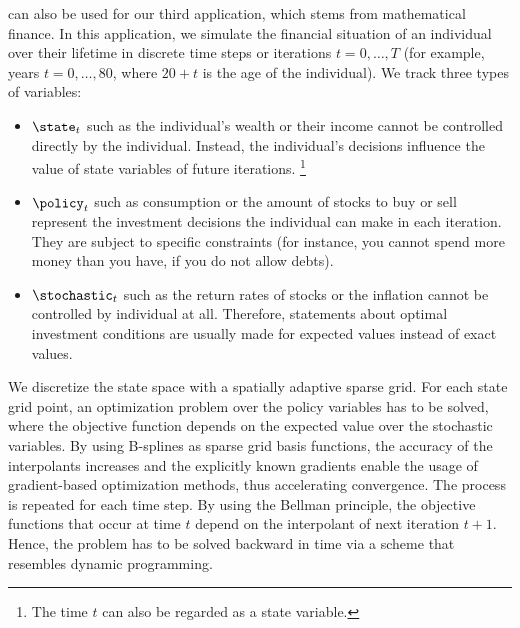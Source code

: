 
\label{chap:80finance}

can also be used for our third application,
which stems from mathematical finance.
In this application, we simulate the financial situation of an individual
over their lifetime in discrete time steps or iterations $t = 0, \dotsc, T$
(for example, years $t = 0, \dotsc, 80$, where $20+t$ is the age
of the individual).
We track three types of variables:

\begin{itemize}
  \item
   $\state_t$
  such as the individual's wealth or their income
  cannot be controlled directly by the individual.
  Instead, the individual's decisions influence the value of
  state variables of future iterations.%
  \footnote{%
    The time $t$ can also be regarded as a state variable.%
  }
  
  \item
   $\policy_t$
  such as consumption or the amount of stocks to buy or sell
  represent the investment decisions the individual can make in
  each iteration.
  They are subject to specific constraints
  (for instance, you cannot spend more money than you have,
  if you do not allow debts).
  
  \item
   $\stochastic_t$
  such as the return rates of stocks or the inflation
  cannot be controlled by individual at all.
  Therefore, statements about optimal investment conditions
  are usually made for expected values instead of exact values.
\end{itemize}

We discretize the state space with a spatially adaptive sparse grid.
For each state grid point, an optimization problem over the policy
variables has to be solved, where the objective function depends
on the expected value over the stochastic variables.
By using B-splines as sparse grid basis functions,
the accuracy of the interpolants increases and
the explicitly known gradients enable the usage of
gradient-based optimization methods, thus accelerating convergence.
The process is repeated for each time step.
By using the Bellman principle, the objective functions that
occur at time $t$ depend on the interpolant of next iteration $t+1$.
Hence, the problem has to be solved backward in time
via a scheme that resembles dynamic programming.

